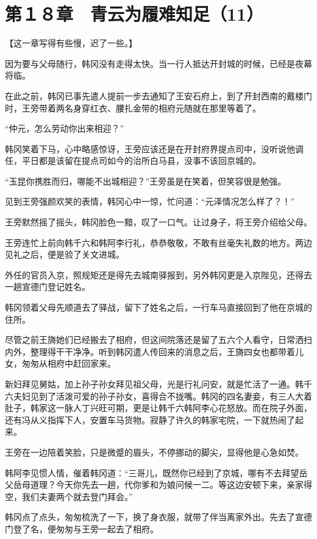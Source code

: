 \section{第１８章　青云为履难知足（11）}

【这一章写得有些慢，迟了一些。】

因为要与父母随行，韩冈没有走得太快。当一行人抵达开封城的时候，已经是夜幕将临。

在此之前，韩冈已事先遣人提前一步去通知了王安石府上，到了开封西南的戴楼门时，王旁带着两名身穿红衣、腰扎金带的相府元随就在那里等着了。

“仲元，怎么劳动你出来相迎？”

韩冈笑着下马，心中略感惊讶，王旁应该还是在开封府界提点司中，没听说他调任，平日都是该留在提点司如今的治所白马县，没事不该回京城的。

“玉昆你携胜而归，哪能不出城相迎？”王旁虽是在笑着，但笑容很是勉强。

见到王旁强颜欢笑的表情，韩冈心中一惊，忙问道：“元泽情况怎么样了？！”

王旁默然摇了摇头，韩冈脸色一黯，叹了一口气。让过身子，将王旁介绍给父母。

王旁连忙上前向韩千六和韩阿李行礼，恭恭敬敬，不敢有丝毫失礼数的地方。两边见礼之后，便是验了关文进城。

外任的官员入京，照规矩还是得先去城南驿报到，另外韩冈更是入京陛见，还得去一趟宣德门登记姓名。

韩冈领着父母先顺道去了驿战，留下了姓名之后，一行车马直接回到了他在京城的住所。

尽管之前王旖她们已经搬去了相府，但这间院落还是留了五六个人看守，日常洒扫内外，整理得干干净净。听到韩冈遣人传回来的消息之后，王旖四女也都带着儿女，匆匆从相府中赶回家来。

新妇拜见舅姑，加上孙子孙女拜见祖父母，光是行礼问安，就是忙活了一通。韩千六夫妇见到了活泼可爱的孙子孙女，喜得合不拢嘴。韩冈的四名妻妾，有三人大着肚子，韩家这一脉人丁兴旺可期，更是让韩千六韩阿李心花怒放。而在院子外面，还有冯从义指挥下人，安置车马货物。寂静了许久的韩家宅院，一下就热闹了起来。

王旁在一边陪着笑脸，只是微蹙的眉头，不停挪动的脚尖，显得他是心急如焚。

韩阿李见惯人情，催着韩冈道：“三哥儿，既然你已经到了京城，哪有不去拜望岳父岳母道理？今天你先去一趟，代你爹和为娘问候一二。等这边安顿下来，亲家得空，我们夫妻两个就去登门拜会。”

韩冈点了点头，匆匆梳洗了一下，换了身衣服，就带了伴当离家外出。先去了宣德门登了名，便匆匆与王旁一起去了相府。

